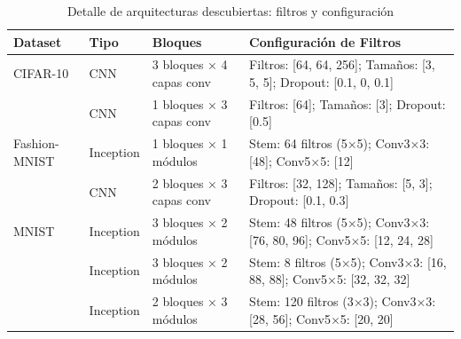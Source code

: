 \begin{table}[htbp]
\centering
\caption{Detalle de arquitecturas descubiertas: filtros y configuración}
\label{tab:arquitecturas_detalle}
\footnotesize
\begin{tabular}{llp{3cm}p{5cm}}
\toprule
\textbf{Dataset} & \textbf{Tipo} & \textbf{Bloques} & \textbf{Configuración de Filtros} \\
\midrule
  CIFAR-10 & CNN & 3 bloques × 4 capas conv & Filtros: [64, 64, 256]; Tamaños: [3, 5, 5]; Dropout: [0.1, 0, 0.1] \\
   & CNN & 1 bloques × 3 capas conv & Filtros: [64]; Tamaños: [3]; Dropout: [0.5] \\
\midrule
  Fashion-MNIST & Inception & 1 bloques × 1 módulos & Stem: 64 filtros (5×5); Conv3×3: [48]; Conv5×5: [12] \\
   & CNN & 2 bloques × 3 capas conv & Filtros: [32, 128]; Tamaños: [5, 3]; Dropout: [0.1, 0.3] \\
\midrule
  MNIST & Inception & 3 bloques × 2 módulos & Stem: 48 filtros (5×5); Conv3×3: [76, 80, 96]; Conv5×5: [12, 24, 28] \\
   & Inception & 3 bloques × 2 módulos & Stem: 8 filtros (5×5); Conv3×3: [16, 88, 88]; Conv5×5: [32, 32, 32] \\
   & Inception & 2 bloques × 3 módulos & Stem: 120 filtros (3×3); Conv3×3: [28, 56]; Conv5×5: [20, 20] \\
\bottomrule
\end{tabular}
\end{table}